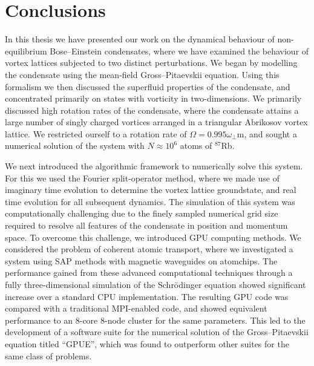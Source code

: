 
\section{Conclusions}
In this thesis we have presented our work on the dynamical behaviour of non-equilibrium Bose--Einstein condensates, where we have examined the behaviour of vortex lattices subjected to two distinct perturbations. We began by modelling the condensate using the mean-field Gross--Pitaevskii equation. Using this formalism we then discussed the superfluid properties of the condensate, and concentrated primarily on states with vorticity in two-dimensions. We primarily discussed high rotation rates of the condensate, where the condensate attains a large number of singly charged vortices arranged in a triangular Abrikosov vortex lattice. We restricted ourself to a rotation rate of $\Omega = 0.995\omega_\perp$m, and sought a numerical solution of the system with $N\approx 10^{6}$ atoms of $^{87}$Rb.

We next introduced the algorithmic framework to numerically solve this system. For this we used the Fourier split-operator method, where we made use of imaginary time evolution to determine the vortex lattice groundstate, and real time evolution for all subsequent dynamics. The simulation of this system was computationally challenging due to the finely sampled numerical grid size required to resolve all features of the condensate in position and momentum space. To overcome this challenge, we introduced GPU computing methods. We considered the problem of coherent atomic transport, where we investigated a system using SAP methods with magnetic waveguides on atomchips. The performance gained from these advanced computational techniques through a fully three-dimensional simulation of the Schr\"odinger equation showed significant increase over a standard CPU implementation. The resulting GPU code was compared with a traditional MPI-enabled code, and showed equivalent performance to an 8-core 8-node cluster for the same parameters. This led to the development of a software suite for the numerical solution of the Gross--Pitaevskii equation titled ``GPUE'', which was found to outperform other suites for the same class of problems.

